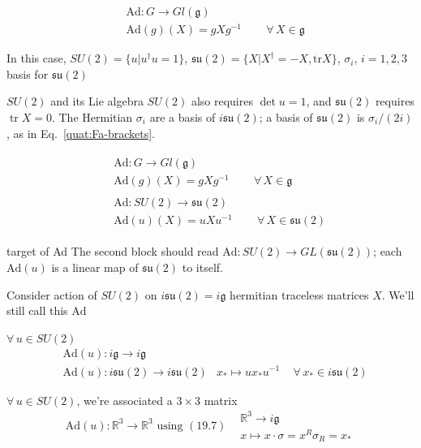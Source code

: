 \[
\begin{aligned}
  & \text{Ad}: G \to Gl(\mathfrak{g}) \\ 
  & \text{Ad}(g)(X) = gXg^{-1} \quad \quad \, \forall \, X \in \mathfrak{g}
\end{aligned}
\]

In this case, $SU(2) = \lbrace u | u^{\dag} u =1 \rbrace$, $\mathfrak{su}(2) = \lbrace X | X^{\dag} = -X, \text{tr}X \rbrace$, $\sigma_i$, $i=1,2,3$ basis for $\mathfrak{su}(2)$

\begin{correction}{$SU(2)$ and its Lie algebra}
$SU(2)$ also requires $\det u=1$, and $\mathfrak{su}(2)$ requires $\operatorname{tr}X=0$. The Hermitian $\sigma_i$ are a basis of $i\mathfrak{su}(2)$; a basis of $\mathfrak{su}(2)$ is $\sigma_i/(2i)$, as in Eq.~\eqref{quat:Fa-brackets}.
\end{correction}

\[
\begin{aligned}
  & \begin{aligned}
  & \text{Ad}: G \to Gl(\mathfrak{g}) \\ 
  & \text{Ad}(g)(X) = gXg^{-1} \quad \quad \, \forall \, X \in \mathfrak{g}
\end{aligned} \\
& \begin{aligned}
  & \text{Ad}: SU(2) \to \mathfrak{su}(2)  \\ 
  & \text{Ad}(u)(X) = uXu^{-1} \quad \quad \, \forall \, X \in \mathfrak{su}(2)
\end{aligned}
\end{aligned}
\]

\begin{correction}{target of Ad}
The second block should read $\mathrm{Ad}\colon SU(2)\to GL(\mathfrak{su}(2))$; each $\mathrm{Ad}(u)$ is a linear map of $\mathfrak{su}(2)$ to itself.
\end{correction}
Consider action of $SU(2)$ on $i\mathfrak{su}(2) = i\mathfrak{g}$ hermitian traceless matrices $X$. We'll still call this $\text{Ad}$

$\forall \, u \in SU(2)$ 
\[
\begin{aligned}
  & \text{Ad}(u) : i\mathfrak{g} \to i\mathfrak{g} \\ 
  & \text{Ad}(u) : i\mathfrak{su}(2) \to i\mathfrak{su}(2)
  & x_* \mapsto ux_*u^{-1} \quad \, \forall \, x_* \in i \mathfrak{su}(2)
\end{aligned}
\]

$\forall \, u \in SU(2)$, we're associated a $3\times 3$ matrix
\[
\text{Ad}(u) : \mathbb{R}^3 \to \mathbb{R}^3 \text{ using } (19.7) \begin{aligned}
  & \mathbb{R}^3 \to i\mathfrak{g} \\
  & x \mapsto x\cdot \sigma = x^R \sigma_R = x_* \end{aligned}
\]

